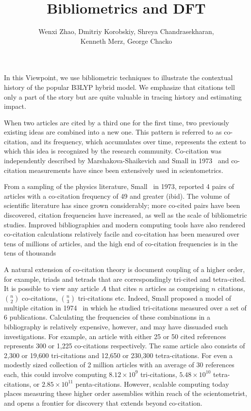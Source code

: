 \documentclass[11pt, oneside]{article}   	%
\title{Bibliometrics and DFT}
\author{Wenxi Zhao, Dmitriy Korobskiy, Shreya Chandrasekharan, \\Kenneth Merz, George Chacko}
\begin{document}
\maketitle

\raggedright
In this Viewpoint, we use bibliometric techniques to illustrate the contextual history of the popular B3LYP hybrid model. We emphasize that citations tell only a part of the story but are quite valuable in tracing history and estimating impact. 

When two articles are cited by a third one for the first time, two previously existing ideas are combined into a new one. This pattern is referred to as co-citation, and its frequency, which accumulates over time, represents the extent to which this idea is recognized by the research community. Co-citation was independently described by Marshakova-Shaikevich and Small in 1973~\citep{MarshakovaShaikevich1973,Small1973} and co-citation measurements have since been extensively used in scientometrics. 

From a sampling of the physics literature, Small~\citep{Small1973} in 1973, reported 4 pairs of articles with a co-citation frequency of 49 and greater (ibid). The volume of scientific literature has since grown considerably; more co-cited pairs have been discovered, citation frequencies have increased, as well as the scale of bibliometric studies. Improved bibliographies and modern computing tools have also rendered co-citation calculations relatively facile and co-citation has been measured over tens of millions of articles, and the high end of co-citation frequencies is in the tens of thousands~\citep{Stringer2010,Uzzi2013,devarakonda_2020}

A natural extension of co-citation theory is document coupling of a higher order, for example, triads and tetrads that are correspondingly tri-cited and tetra-cited. It is possible to view any article $A$ that cites $n$ articles as comprising $n$ citations, $n\choose2$ co-citations, $n\choose3$ tri-citations etc. Indeed, Small proposed a model of multiple citation in 1974~\citep{small1974multiple} in which he studied tri-citations measured over a set of 6 publications.  Calculating the frequencies of these combinations in a bibliography is relatively expensive, however, and may have dissuaded such investigations. For example, an article with either 25 or 50 cited references represents 300 or 1,225 co-citations respectively. The same article also consists of  2,300 or 19,600 tri-citations and  12,650 or  230,300 tetra-citations. For even a modestly sized collection of 2 million articles with an average of 30 references each, this could involve computing $8.12\times10^9$ tri-citations, $5.48\times10^{10}$ tetra-citations, or $2.85\times10^{11}$ penta-citations. However, scalable computing today places measuring these higher order assemblies within reach of the scientometrist, and opens a frontier for discovery that extends beyond co-citation.
\end{document}
